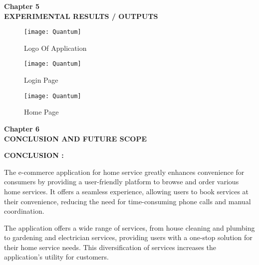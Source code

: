 \documentclass[12pt]{article}
\begin{document}
\begin{center}
 \LARGE \textbf {Chapter 5 }\\[10mm]
 \Large \textbf{EXPERIMENTAL RESULTS / OUTPUTS }\\[10mm]
 \end{center}
 
 \begin{figure}[h]
 \centering
 \texttt{[image: Quantum]}
 \caption{Logo Of Application}
 \end{figure}

 
 \begin{figure}[h]
 \centering
 \texttt{[image: Quantum]}
 \caption{Login Page}
 \end{figure}
 
 \begin{figure}[h]
 \centering
 \texttt{[image: Quantum]}
  \caption{Home Page}
 \end{figure}
 
\clearpage


\begin{center}
 \LARGE \textbf {Chapter 6 }\\[10mm]
 \Large \textbf{CONCLUSION AND FUTURE SCOPE }\\[10mm]
 \end{center}
 \large \textbf{CONCLUSION :}\\[3mm]\par

The e-commerce application for home service greatly enhances convenience for consumers by providing a user-friendly platform to browse and order various home services. It offers a seamless experience, allowing users to book services at their convenience, reducing the need for time-consuming phone calls and manual coordination.\\[1mm]\par 
The application offers a wide range of services, from house cleaning and plumbing to gardening and electrician services, providing users with a one-stop solution for their home service needs. This diversification of services increases the application's utility for customers.\\[2mm]
\end{document}

